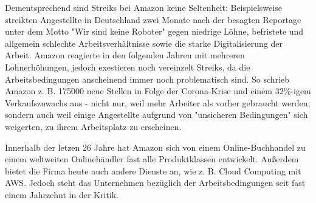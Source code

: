 Dementsprechend sind Streiks bei Amazon keine Seltenheit: Beispielsweise streikten Angestellte in Deutschland zwei Monate nach der besagten Reportage unter dem Motto "Wir sind keine Roboter" gegen niedrige Löhne, befristete und allgemein schlechte Arbeitsverhältnisse sowie die starke Digitalisierung der Arbeit\cite[S. 6]{Apicella}. Amazon reagierte in den folgenden Jahren mit mehreren Lohnerhöhungen, jedoch exestieren noch vereinzelt Streiks, da die Arbeitsbedingungen anscheinend immer noch problematisch sind\cite{JGraf}. So schrieb Amazon z. B. 175000 neue Stellen in Folge der Corona-Krise und einem 32\%-igem Verkaufszuwachs aus - nicht nur, weil mehr Arbeiter als vorher gebraucht werden, sondern auch weil einige Angestellte aufgrund von "unsicheren Bedingungen" sich weigerten, zu ihrem Arbeitsplatz zu erscheinen\cite{Theweek}.

Innerhalb der letzen 26 Jahre hat Amazon sich von einem Online-Buchhandel zu einem weltweiten Onlinehändler fast alle Produktklassen entwickelt. Außerdem bietet die Firma heute auch andere Dienste an, wie z. B. Cloud Computing mit \ac{AWS}. Jedoch steht das Unternehmen bezüglich der Arbeitsbedingungen seit fast einem Jahrzehnt in der Kritik.
